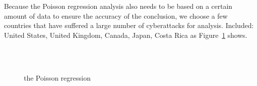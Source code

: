     Because the Poisson regression analysis also needs to be based on a certain amount of data to ensure the accuracy of the conclusion,
    we choose a few countries that have suffered a large number of cyberattacks for analysis.
    Included: United States, United Kingdom, Canada, Japan, Costa Rica as Figure~\ref{fig:the-poisson-regression} shows.
    \begin{figure}[htbp]
        \centering
        \hfill
        \\
        \hfill
        \hfill
        \\
        \caption{the Poisson regression}\label{fig:the-poisson-regression}
    \end{figure}

